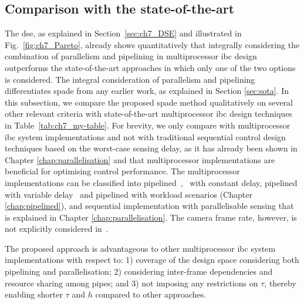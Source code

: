 \subsection{Comparison with the state-of-the-art}
The \gls{dse}, as explained in Section~\ref{sec:ch7_DSE} and illustrated in Fig.~\ref{fig:ch7_Pareto}, already shows quantitatively that integrally considering the combination of parallelism and pipelining in multiprocessor \gls{ibc} design outperforms the state-of-the-art approaches in which only one of the two options is considered. The integral consideration of parallelism and pipelining differentiates \gls{spade} from any earlier work, as explained in Section \ref{sec:sota}. In this subsection, we compare the proposed \gls{spade} method qualitatively on several other relevant criteria with state-of-the-art multiprocessor \gls{ibc} design techniques in Table~\ref{tab:ch7_my-table}. 
For brevity, we only compare with multiprocessor \gls{ibc} system implementations and not with traditional sequential control design techniques based on the worst-case sensing delay, as it has already been shown in Chapter \ref{chap:parallelisation} and \cite{fontantelli2013optimal} that multiprocessor implementations are beneficial for optimising control performance.
The multiprocessor implementations can be classified into pipelined~\cite{krautgartner1998performance},~\cite{medina2019designing} with constant delay, pipelined with variable delay~\cite{medina2019implementation} and pipelined with workload scenarios (Chapter \ref{chap:pipelined}), and sequential implementation with parallelisable sensing that is explained in Chapter \ref{chap:parallelisation}.
The camera frame rate, however, is not explicitly considered in~\cite{krautgartner1998performance}.

The proposed approach is advantageous to other multiprocessor \gls{ibc} system implementations with respect to: 1) coverage of the design space considering both pipelining and parallelisation; 2) considering inter-frame dependencies and resource sharing among pipes; and 3) not imposing any restrictions on $\tau$, thereby enabling shorter $\tau$ and $h$ compared to other approaches.